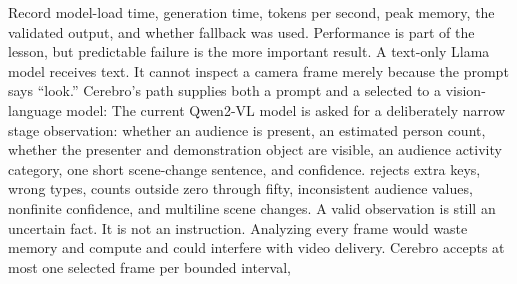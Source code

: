 \markdownRendererOlEnd \markdownRendererInterblockSeparator
{}Record model-load time, generation time, tokens per second, peak memory, the\markdownRendererSoftLineBreak
{}validated output, and whether fallback was used. Performance is part of the\markdownRendererSoftLineBreak
{}lesson, but predictable failure is the more important result.\markdownRendererInterblockSeparator
{}\markdownRendererThematicBreak{}\markdownRendererInterblockSeparator
{}
\markdownRendererSectionEnd 
\markdownRendererSectionEnd \markdownRendererSectionBegin
{}\markdownRendererInterblockSeparator
{}A text-only Llama model receives text. It cannot inspect a camera frame merely\markdownRendererSoftLineBreak
{}because the prompt says “look.” Cerebro's  path supplies both a prompt\markdownRendererSoftLineBreak
{}and a selected  to a vision-language model:\markdownRendererInterblockSeparator
{}\markdownRendererInterblockSeparator
{}The current Qwen2-VL model is asked for a deliberately narrow stage\markdownRendererSoftLineBreak
{}observation: whether an audience is present, an estimated person count,\markdownRendererSoftLineBreak
{}whether the presenter and demonstration object are visible, an audience\markdownRendererSoftLineBreak
{}activity category, one short scene-change sentence, and confidence.\markdownRendererInterblockSeparator
{}\markdownRendererInterblockSeparator
{} rejects extra keys, wrong types, counts outside\markdownRendererSoftLineBreak
{}zero through fifty, inconsistent audience values, nonfinite confidence, and\markdownRendererSoftLineBreak
{}multiline scene changes. A valid observation is still an uncertain fact. It is\markdownRendererSoftLineBreak
{}not an instruction.\markdownRendererInterblockSeparator
{}\markdownRendererSectionBegin
{}\markdownRendererInterblockSeparator
{}Analyzing every frame would waste memory and compute and could interfere with\markdownRendererSoftLineBreak
{}video delivery. Cerebro accepts at most one selected frame per bounded interval,\markdownRendererSoftLineBreak
